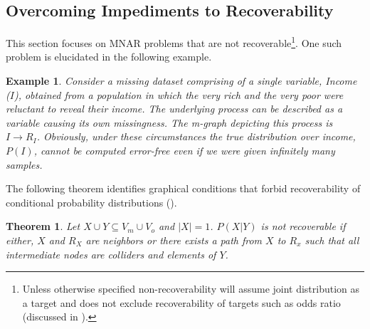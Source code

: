 \documentclass[12pt]{article}
\newtheorem{example}{Example}
\newtheorem{thm}{Theorem}
\begin{document}
\subsection{Overcoming Impediments to Recoverability}
This section focuses on MNAR problems that are not recoverable\footnote{Unless otherwise specified non-recoverability will assume joint distribution as a target and does not exclude recoverability of targets such as odds ratio (discussed in \cite{bartlett2015asymptotically}). }. One such problem is elucidated in the following example. 
\begin{example}
Consider a missing dataset comprising of a single variable, Income ($I$), obtained from a population in which the very rich and the very poor were reluctant to reveal their income. The underlying  process can be described as a variable causing its own missingness. The m-graph depicting this process is $I \to R_I$.  Obviously,  under these circumstances the true distribution over income, $P(I)$, cannot be computed error-free even if we were given infinitely many samples. 
\end{example}
The following theorem identifies graphical conditions that forbid recoverability of conditional probability distributions (\cite{mohan2014_missing}).
\begin{thm} Let $X \cup Y \subseteq V_m \cup V_o$ and $|X|=1$.
	$P(X|Y)$ is not recoverable if  either, $X$ and $R_{X}$ are neighbors or there exists a path from $X$ to $R_x$ such that all intermediate nodes are colliders and elements of $Y$. \label{thm:nonrecov}
\end{thm}
\end{document}
